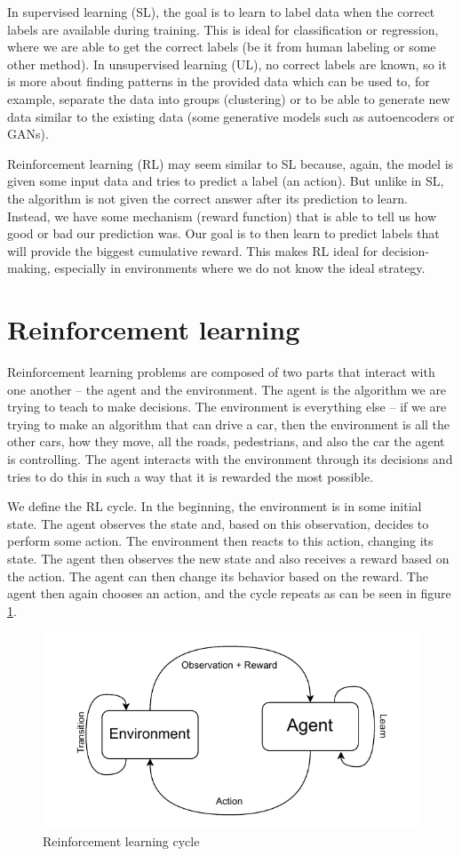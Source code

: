 \documentclass[
  digital,     %
  oneside,     %
  nosansbold,  %
  nocolorbold, %
  lof,         %
  lot,         %
]{fithesis4}
\begin{document}
In supervised learning (SL), the goal is to learn to label data when the correct labels are available during training. This is ideal for classification or regression, where we are able to get the correct labels (be it from human labeling or some other method).
In unsupervised learning (UL), no correct labels are known, so it is more about finding patterns in the provided data which can be used to, for example, separate the data into groups (clustering) or to be able to generate new data similar to the existing data (some generative models such as autoencoders or GANs).

Reinforcement learning (RL) may seem similar to SL because, again, the model is given some input data and tries to predict a label (an action). But unlike in SL, the algorithm is not given the correct answer after its prediction to learn. Instead, we have some mechanism (reward function) that is able to tell us how good or bad our prediction was. Our goal is to then learn to predict labels that will provide the biggest cumulative reward. This makes RL ideal for decision-making, especially in environments where we do not know the ideal strategy.

\section{Reinforcement learning}
Reinforcement learning problems are composed of two parts that interact with one another -- the agent and the environment. The agent is the algorithm we are trying to teach to make decisions. The environment is everything else -- if we are trying to make an algorithm that can drive a car, then the environment is all the other cars, how they move, all the roads, pedestrians, and also the car the agent is controlling. The agent interacts with the environment through its decisions and tries to do this in such a way that it is rewarded the most possible.

We define the RL cycle. In the beginning, the environment is in some initial state. The agent observes the state and, based on this observation, decides to perform some action. The environment then reacts to this action, changing its state. The agent then observes the new state and also receives a reward based on the action. The agent can then change its behavior based on the reward. The agent then again chooses an action, and the cycle repeats as can be seen in figure \ref{fig:rl-cycle}.

\begin{figure}
    \centering
    \includegraphics[width=0.75\linewidth]{diagrams/rl-cycle.pdf}
    \caption{Reinforcement learning cycle}
    \label{fig:rl-cycle}
\end{figure}
\end{document}
